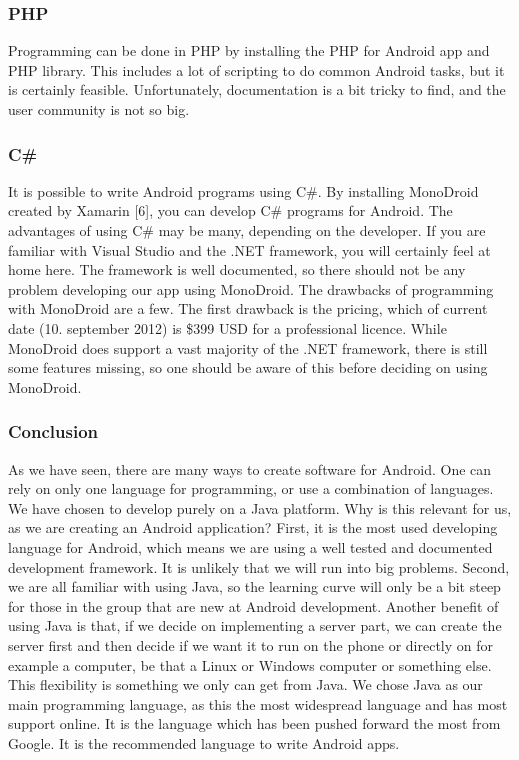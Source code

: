 \subsubsection{PHP}
Programming can be done in PHP by installing the PHP for Android app and PHP library. This includes a lot of scripting to do common Android tasks, but it is certainly feasible. Unfortunately, documentation is a bit tricky to find, and the user community is not so big.

\subsubsection{C\#}
It is possible to write Android programs using C\#. By installing MonoDroid created by Xamarin [6], you can develop C\# programs for Android. The advantages of using C\# may be many, depending on the developer. If you are familiar with Visual Studio and the .NET framework, you will certainly feel at home here. The framework is well documented, so there should not be any problem developing our app using MonoDroid.
\newline
\newline
The drawbacks of programming with MonoDroid are a few. The first drawback is the pricing, which of current date (10. september 2012) is \$399 USD for a professional licence. While MonoDroid does support a vast majority of the .NET framework, there is still some features missing, so one should be aware of this before deciding on using MonoDroid.

\subsubsection{Conclusion}
As we have seen, there are many ways to create software for Android. One can rely on only one language for programming, or use a combination of languages. We have chosen to develop purely on a Java platform. Why is this relevant for us, as we are creating an Android application?
\newline
\newline
First, it is the most used developing language for Android, which means we are using a well tested and documented development framework. It is unlikely that we will run into big problems. Second, we are all familiar with using Java, so the learning curve will only be a bit steep for those in the group that are new at Android development.  Another benefit of using Java is that, if we decide on implementing a server part, we can create the server first and then decide if we want it to run on the phone or directly on for example a computer, be that a Linux or Windows computer or something else. This flexibility is something we only can get from Java.
\newline
\newline
We chose Java as our main programming language, as this the most widespread language and has most support online. It is the language which has been pushed forward the most from Google. It is the recommended language to write Android apps.






